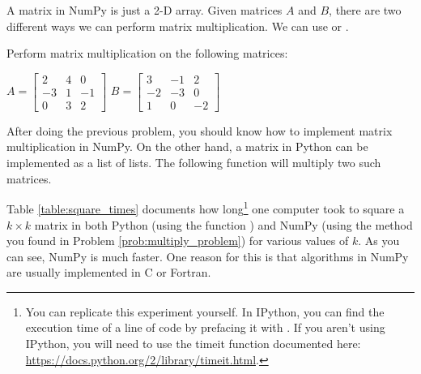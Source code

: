 \begin{problem}
A matrix in NumPy is just a 2-D array. Given matrices $A$ and $B$, there are two different ways we can perform matrix multiplication. We can use  or . 

Perform matrix multiplication on the following matrices:
\begin{center}
$A = \begin{bmatrix} 2&4&0 \\ -3&1&-1 \\ 0&3&2 \end{bmatrix}$
$B = \begin{bmatrix} 3&-1&2 \\ -2&-3&0 \\ 1&0&-2 \end{bmatrix}$
\end{center}
\end{problem}




After doing the previous problem, you should know how to implement matrix multiplication in NumPy. 
On the other hand, a matrix in Python can be implemented as a list of lists. 
The following function will multiply two such matrices.



Table \ref{table:square_times} documents how long\footnote{You can replicate this experiment yourself. In IPython, you can find the execution time of a line of code by prefacing it with . 
If you aren't using IPython, you will need
to use the timeit function documented here: \url{https://docs.python.org/2/library/timeit.html}.} 
one computer took to square a $k \times k$ matrix in both Python (using the function ) and NumPy (using the method you found in Problem \ref{prob:multiply_problem}) for various values of $k$. 
As you can see, NumPy is much faster. One reason for this is that algorithms in NumPy are usually implemented in C or Fortran. 

